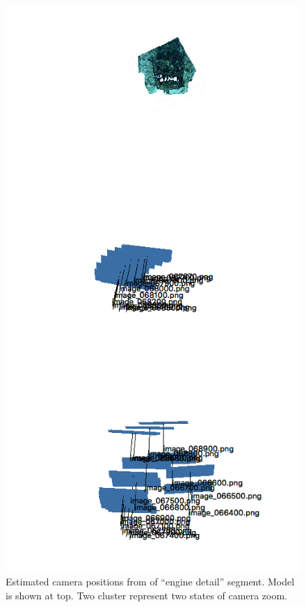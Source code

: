 \documentclass[letterpaper,12pt]{article}
\begin{document}
\begin{figure}
    \centering
    \includegraphics[height=0.9\textheight]{images/engine_detail_photoscan_trajectory.png}
    \caption{Estimated camera positions from of ``engine detail'' segment.  Model is shown at top.  Two cluster represent two states of camera zoom.}
    \label{fig:ex1605l3_dive22_engine_detail_photoscan_trajectory}
\end{figure}
\end{document}
